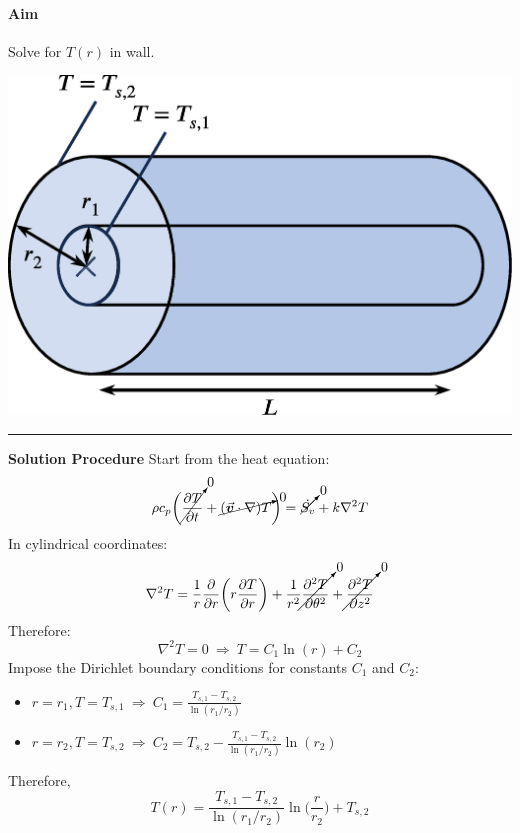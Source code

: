 \documentclass[12pt, a4paper]{article}
\numberwithin{equation}{subsection}
\begin{document}
\begin{tcolorbox}[breakable, title = \textbf{Example: Conduction Through a Cylinder}]
\begin{minipage}{.6\textwidth}
\paragraph{Aim} Solve for $T(r)$ in wall.
\end{minipage}
\hfill
\begin{minipage}{.4\textwidth}
    \includegraphics[width=\textwidth]{img/oneD_conduction_cylinder.eps}
\end{minipage}
\vspace{.2cm}
\hrule
\vspace{.2cm}
\textbf{Solution Procedure} Start from the heat equation:
\[ 
    \rho c_{p}\bigg(\cancelto{0}{\frac{\partial T}{\partial t}} +\cancelto{0}{(\vec{\bm{v}} \cdot \nabla) T} \bigg) = \cancelto{0}{\dot{S_{v}}} + k\nabla^{2} T 
\]
In cylindrical coordinates:
\[ 
    \nabla^{2} T = \frac{1}{r}\frac{\partial}{\partial r} \bigg(r\frac{\partial T}{\partial r}\bigg)+ \frac{1}{r^{2}} \cancelto{0}{\frac{\partial^{2}T}{\partial \theta^{2}}}+\cancelto{0}{\frac{\partial^{2}T}{\partial z^{2}} }
\]
Therefore:
\[ 
    \nabla^{2} T = 0 \ \Rightarrow \ T=C_{1} \ln(r)+C_{2} 
\]
Impose the Dirichlet boundary conditions for constants $C_1$ and $C_2$: 
\begin{itemize}
    \item $\displaystyle r=r_{1}, T=T_{s,1} \ \Rightarrow \ C_{1}=\frac{T_{s,1}-T_{s,2}}{\ln(r_{1}/r_{2})}$
    \item $\displaystyle r=r_{2}, T=T_{s,2} \ \Rightarrow \ C_{2}=T_{s,2}-\frac{T_{s,1}-T_{s,2}}{\ln(r_{1}/r_{2})}\ln(r_{2})$
\end{itemize}
Therefore,
\[ 
    T(r) = \frac{T_{s,1}-T_{s,2}}{\ln(r_{1}/r_{2})} \ln \bigg(\frac{r}{r_{2}}\bigg) + T_{s,2} 
\]

\end{tcolorbox}
\end{document}
